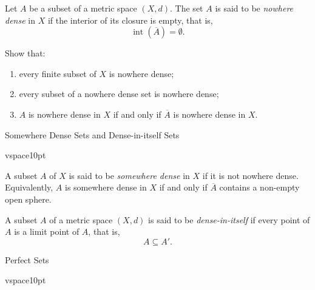 \documentclass[12pt, a4paper]{article}
\begin{document}
\vspace{10pt}

\begin{definition}
Let $A$ be a subset of a metric space $(X,d)$. The set $A$ is said to be
\emph{nowhere dense} in $X$ if the interior of its closure is empty, that is,
\[
\operatorname{int}(\overline{A})=\emptyset.
\]
\end{definition}

\vspace{10pt}

\begin{problem}
Show that:
\begin{enumerate}
    \item every finite subset of $X$ is nowhere dense;
    \item every subset of a nowhere dense set is nowhere dense;
    \item $A$ is nowhere dense in $X$ if and only if $\overline{A}$ is nowhere dense in $X$.
\end{enumerate}
\end{problem}

\clearpage

\begin{heading}
    Somewhere Dense Sets and Dense-in-itself Sets
\end{heading}

vspace{10pt}

\begin{definition}
A subset $A$ of $X$ is said to be \emph{somewhere dense} in $X$ if it is not nowhere dense.
Equivalently, $A$ is somewhere dense in $X$ if and only if $\overline{A}$ contains a non-empty
open sphere.
\end{definition}

\vspace{10pt}

\begin{definition}
A subset $A$ of a metric space $(X,d)$ is said to be \emph{dense-in-itself} if every point of
$A$ is a limit point of $A$, that is,
\[
A\subseteq A'.
\]
\end{definition}

\clearpage

\begin{heading}
    Perfect Sets
\end{heading}

vspace{10pt}
\end{document}

